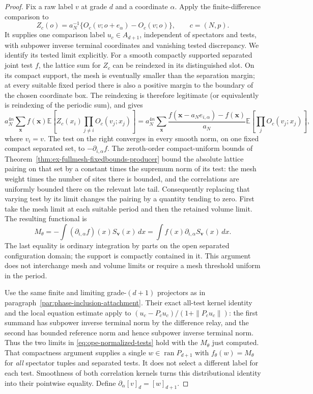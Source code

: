 \begin{proof}
Fix a raw label $v$ at grade $d$ and a coordinate $\alpha$. Apply the
finite-difference comparison to
\[
 Z_c(o)=a_N^{-1}\{O_c(v;o+e_\alpha)-O_c(v;o)\},\qquad c=(N,p).
\]
It supplies one comparison label $u_c\in A_{d+1}$, independent of
spectators and tests, with subpower inverse terminal coordinates and
vanishing tested discrepancy. We identify its tested limit explicitly.
For a smooth compactly supported separated joint test $f$, the lattice
sum for $Z_c$ can be reindexed in its distinguished slot. On its compact
support, the mesh is eventually smaller than the separation margin;
at every suitable fixed period there is also a positive margin to the
boundary of the chosen coordinate box. The reindexing is therefore
legitimate (or equivalently is reindexing of the periodic sum), and gives
\[
 a_N^{4n}\sum_{\boldsymbol x} f(\boldsymbol x)
       \mathbb E[Z_c(x_i)\prod_{j\ne i}O_c(v_j;x_j)]
 =a_N^{4n}\sum_{\boldsymbol x}
 \frac{f(\boldsymbol x-a_N e_{i,\alpha})-f(\boldsymbol x)}{a_N}
       \mathbb E[\prod_jO_c(v_j;x_j)],
\]
where $v_i=v$. The test on the right converges in every smooth norm,
on one fixed compact separated set, to $-\partial_{i,\alpha}f$.
The zeroth-order compact-uniform bounds of
Theorem~\ref{thm:ex-fullmesh-fixedbounds-producer} bound the absolute lattice pairing on
that set by a constant times the supremum norm of its test: the mesh
weight times the number of sites there is bounded, and the correlations
are uniformly bounded there on the relevant late tail. Consequently
replacing that varying test by its limit changes the pairing by a
quantity tending to zero. First take the mesh limit at each suitable
period and then the retained volume limit. The resulting functional is
\[
 M_\theta=-\int (\partial_{i,\alpha}f)(x)S_{\boldsymbol v}(x)\,dx
          =\int f(x)\partial_{i,\alpha}S_{\boldsymbol v}(x)\,dx.
\]
The last equality is ordinary integration by parts on the open separated
configuration domain; the support is compactly contained in it. This
argument does not interchange mesh and volume limits or require a mesh
threshold uniform in the period.

Use the same finite and limiting grade-$(d+1)$ projectors as in
paragraph~\ref{par:phase-inclusion-attachment}. Their exact all-test
kernel identity and the local equation estimate apply to
$(u_c-P_cu_c)/(1+\|P_cu_c\|)$: the first summand has subpower inverse
terminal norm by the difference relay, and the second has bounded
reference norm and hence subpower inverse terminal norm. Thus the two
limits in \eqref{eq:ope-normalized-tests} hold with the $M_\theta$ just
computed. That compactness argument supplies a single
$w\in\operatorname{ran}P_{d+1}$ with $f_\theta(w)=M_\theta$ for
\emph{all} spectator tuples and separated tests. It does not select a
different label for each test. Smoothness of both correlation kernels
turns this distributional identity into their pointwise equality.
Define $\partial_\alpha[v]_d=[w]_{d+1}$.


\end{proof}
